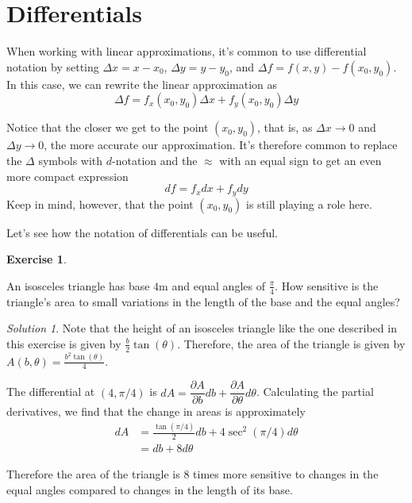 \documentclass[
]{book}
\theoremstyle{definition}
\theoremstyle{definition}
\theoremstyle{definition}
\newtheorem{exercise}{Exercise}[chapter]
\theoremstyle{definition}
\theoremstyle{remark}
\newtheorem*{solution}{Solution}
\begin{document}
\hypertarget{differentials}{%
\section{Differentials}\label{differentials}}

When working with linear approximations, it's common to use differential notation by setting \(\Delta x = x-x_0\), \(\Delta y = y- y_0\), and \(\Delta f = f(x,y)-f(x_0, y_0)\). In this case, we can rewrite the linear approximation as \[\Delta f = f_x(x_0, y_0)\Delta x + f_y(x_0, y_0) \Delta y\]

Notice that the closer we get to the point \((x_0, y_0)\), that is, as \(\Delta x \to 0\) and \(\Delta y \to 0\), the more accurate our approximation. It's therefore common to replace the \(\Delta\) symbols with \(d\)-notation and the \(\approx\) with an equal sign to get an even more compact expression \[df = f_x dx+f_y dy\] Keep in mind, however, that the point \((x_0, y_0)\) is still playing a role here.

Let's see how the notation of differentials can be useful.

\begin{exercise}
\protect\hypertarget{exr:unlabeled-div-28}{}\label{exr:unlabeled-div-28}

An isosceles triangle has base \(4\)m and equal angles of \(\frac{\pi}{4}\). How sensitive is the triangle's area to small variations in the length of the base and the equal angles?

\end{exercise}

\begin{solution}

Note that the height of an isosceles triangle like the one described in this exercise is given by \(\frac{b}{2}\tan(\theta)\). Therefore, the area of the triangle is given by \(A(b, \theta)= \frac{b^2 \tan(\theta)}{4}\).

The differential at \((4, \pi/4)\) is \(dA= \dfrac{\partial A}{\partial b}db + \dfrac{\partial A}{\partial \theta}d\theta\). Calculating the partial derivatives, we find that the change in areas is approximately
\begin{align*}
dA &= \frac{\tan(\pi/4)}{2}db + 4 \sec^2(\pi/4)d\theta\\  
&= db + 8 d\theta
\end{align*}

Therefore the area of the triangle is \(8\) times more sensitive to changes in the equal angles compared to changes in the length of its base.

\end{solution}
\end{document}
